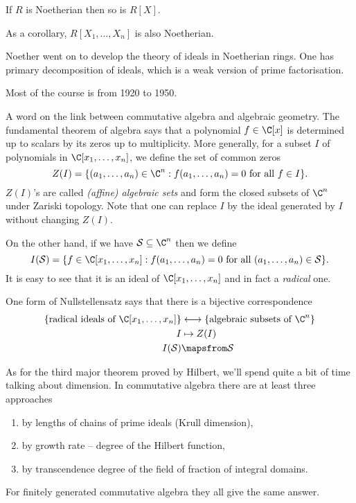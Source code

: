 \documentclass[a4paper]{article}
\begin{document}
\begin{theorem}
  If \(R\) is Noetherian then so is \(R[X]\).
\end{theorem}
As a corollary, \(R[X_1, \dots, X_n]\) is also Noetherian.

Noether went on to develop the theory of ideals in Noetherian rings. One has primary decomposition of ideals, which is a weak version of prime factorisation.

Most of the course is from 1920 to 1950.

A word on the link between commutative algebra and algebraic geometry. The fundamental theorem of algebra says that a polynomial \(f \in \C[x]\) is determined up to scalars by its zeros up to multiplicity. More generally, for a subset \(I\) of polynomials in \(\C[x_1, \dots, x_n]\), we define the set of common zeros
\[
  Z(I) = \{(a_1, \dots, a_n) \in \C^n: f(a_1, \dots, a_n) = 0 \text{ for all } f \in I\}.
\]
\(Z(I)\)'s are called \emph{(affine) algebraic sets} and form the closed subsets of \(\C^n\) under Zariski topology. Note that one can replace \(I\) by the ideal generated by \(I\) without changing \(Z(I)\).

On the other hand, if we have \(\mathcal S \subseteq \C^n\) then we define
\[
  I(\mathcal S) = \{f \in \C[x_1, \dots, x_n]: f(a_1, \dots, a_n) = 0 \text{ for all } (a_1, \dots, a_n) \in \mathcal S\}.
\]
It is easy to see that it is an ideal of \(\C[x_1, \dots, x_n]\) and in fact a \emph{radical} one.

One form of Nullstellensatz says that there is a bijective correspondence
\begin{align*}
  \{\text{radical ideals of } \C[x_1, \dots, x_n]\} &\longleftrightarrow \{\text{algebraic subsets of } \C^n\} \\
  I &\mapsto Z(I) \\
  I(\mathcal S) &\mapsfrom \mathcal S
\end{align*}

As for the third major theorem proved by Hilbert, we'll spend quite a bit of time talking about dimension. In commutative algebra there are at least three approaches
\begin{enumerate}
\item by lengths of chains of prime ideals (Krull dimension),
\item by growth rate -- degree of the Hilbert function,
\item by transcendence degree of the field of fraction of integral domains.
\end{enumerate}
For finitely generated commutative algebra they all give the same answer.
\end{document}
